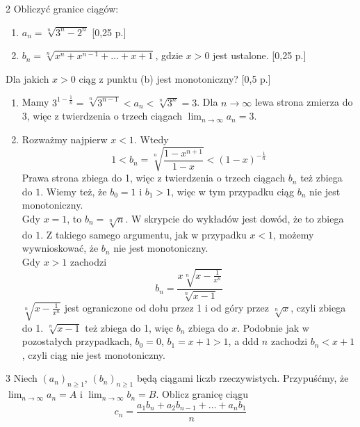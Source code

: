 \documentclass{../note}
\begin{document}
\begin{zadanie}{2}
Obliczyć granice ciągów:
\begin{enumerate}[label=(\alph*)]
    \item $a_{n}=\sqrt[n]{3^{n}-2^{n}}$ \hfill [0,25 p.]
    \item $b_{n}=\sqrt[n]{x^{n}+x^{n-1}+\dots+x+1}$, gdzie $x>0$ jest ustalone. \hfill [0,25 p.]
\end{enumerate}
Dla jakich $x>0$ ciąg z punktu (b) jest monotoniczny? \hfill [0,5 p.]
\end{zadanie}
\begin{rozwiazanie}
\begin{enumerate}[label=(\alph*)]
    \item Mamy $3^{1 - \frac1n} = \sqrt[n]{3^{n-1}} < a_n < \sqrt[n]{3^n} = 3$. Dla $n \rightarrow \infty$ lewa strona zmierza do 3, więc z twierdzenia o trzech ciągach $\lim_{n\rightarrow\infty} a_n = 3$.
    \item Rozważmy najpierw $x < 1$. Wtedy 
    \[1 < b_n = \sqrt[n]{\frac{1-x^{n+1}}{1-x}} < (1-x)^{-\frac{1}{n}}\]
    Prawa strona zbiega do 1, więc z twierdzenia o trzech ciągach $b_n$ też zbiega do $1$. Wiemy też, że $b_0 = 1$ i $b_1 > 1$, więc w tym przypadku ciąg $b_n$ nie jest monotoniczny.\\
    Gdy $x = 1$, to $b_n = \sqrt[n]{n}$. W skrypcie do wykładów jest dowód, że to zbiega do $1$. Z takiego samego argumentu, jak w przypadku $x < 1$, możemy wywnioskować, że $b_n$ nie jest monotoniczny.\\
    Gdy $x > 1$ zachodzi 
    \[b_n = \frac{x\sqrt[n]{x-\frac{1}{x^n}}}{\sqrt[n]{x-1}}\]
    $\sqrt[n]{x-\frac{1}{x^n}}$ jest ograniczone od dołu przez 1 i od góry przez $\sqrt[n]{x}$, czyli zbiega do 1. $\sqrt[n]{x-1}$ też zbiega do 1, więc $b_n$ zbiega do $x$. Podobnie jak w pozostałych przypadkach, $b_0 = 0$, $b_1 = x+1 > 1$, a ddd $n$ zachodzi $b_n < x + 1$, czyli ciąg nie jest monotoniczny.
\end{enumerate}
\end{rozwiazanie}
\begin{zadanie}{3}
Niech $(a_{n})_{n\ge1}$, $(b_{n})_{n\ge1}$ będą ciągami liczb rzeczywistych. Przypuśćmy, że $\lim_{n\rightarrow\infty}a_{n}=A$ i $\lim_{n\rightarrow\infty}b_{n}=B$. Oblicz granicę ciągu
\[ c_{n}=\frac{a_{1}b_{n}+a_{2}b_{n-1}+\dots+a_{n}b_{1}}{n} \]
\end{zadanie}
\end{document}
